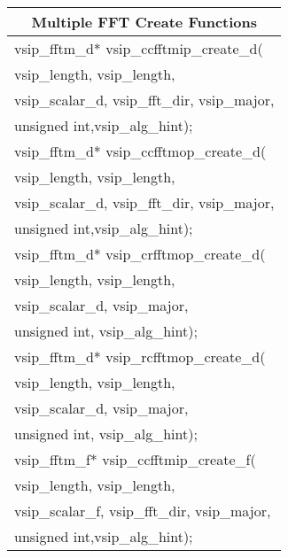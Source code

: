\newline\hspace*{1.1cm} {
\begin{tabular}[H]{l}\hline
\multicolumn{1}{c}{\rmfamily \bfseries Multiple FFT Create Functions}\\ \hline
vsip\_fftm\_d* vsip\_ccfftmip\_create\_d(\\*\hspace{.7cm}vsip\_length, vsip\_length,\\*\hspace{.7cm}vsip\_scalar\_d, vsip\_fft\_dir, vsip\_major,\\*\hspace{.7cm} unsigned int,vsip\_alg\_hint);\\
vsip\_fftm\_d* vsip\_ccfftmop\_create\_d(\\*\hspace{.7cm}vsip\_length, vsip\_length,\\*\hspace{.7cm}vsip\_scalar\_d, vsip\_fft\_dir, vsip\_major,\\*\hspace{.7cm} unsigned int,vsip\_alg\_hint);\\
vsip\_fftm\_d* vsip\_crfftmop\_create\_d(\\*\hspace{.7cm}vsip\_length, vsip\_length,\\*\hspace{.7cm}vsip\_scalar\_d, vsip\_major,\\*\hspace{.7cm} unsigned int, vsip\_alg\_hint);\\
vsip\_fftm\_d* vsip\_rcfftmop\_create\_d(\\*\hspace{.7cm}vsip\_length, vsip\_length,\\*\hspace{.7cm}vsip\_scalar\_d, vsip\_major,\\*\hspace{.7cm} unsigned int, vsip\_alg\_hint);\\
vsip\_fftm\_f* vsip\_ccfftmip\_create\_f(\\*\hspace{.7cm}vsip\_length, vsip\_length,\\*\hspace{.7cm}vsip\_scalar\_f, vsip\_fft\_dir, vsip\_major,\\*\hspace{.7cm} unsigned int,vsip\_alg\_hint);\\

\end{tabular}}
